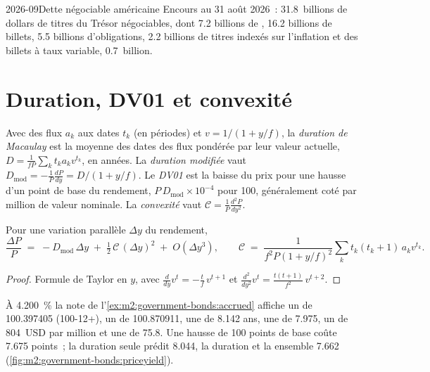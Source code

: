 \begin{dated}{2026-09}{Dette négociable américaine}\label{dat:m2:government-bonds:debt}
Encours au 31 août 2026~: 31.8~billions de dollars de titres du Trésor
négociables, dont 7.2 billions de , 16.2 billions de billets, 5.5
billions d'obligations, 2.2 billions de titres indexés sur l'inflation et des billets
à taux variable, 0.7~billion.
\end{dated}

\section{Duration, DV01 et convexité}

\begin{definition}\label{def:m2:government-bonds:duration}
Avec des flux $a_k$ aux dates $t_k$ (en périodes) et $v = 1/(1 + y/f)$, la
\emph{duration de Macaulay} est la moyenne des dates
des flux pondérée par leur valeur actuelle, $D = \frac{1}{f P}\sum_k t_k a_k v^{t_k}$,
en années. La \emph{duration modifiée} vaut
$D_{\mathrm{mod}} = -\frac1P \frac{dP}{dy} = D/(1 + y/f)$.
Le \emph{DV01} est la baisse du prix pour une hausse d'un point de base
du rendement, $P\,D_{\mathrm{mod}} \times 10^{-4}$ pour 100, généralement coté par million
de valeur nominale. La \emph{convexité} vaut $\mathcal C = \frac1P
\frac{d^2P}{dy^2}$.
\end{definition}

\begin{proposition}\label{prop:m2:government-bonds:taylor}
Pour une variation parallèle $\Delta y$ du rendement,
\[
\frac{\Delta P}{P} \;=\; -D_{\mathrm{mod}}\,\Delta y \;+\; \tfrac12\,\mathcal C\,(\Delta y)^2 \;+\; O(\Delta y^3),
\qquad
\mathcal C \;=\; \frac{1}{f^2 P (1+y/f)^2}\sum_k t_k(t_k+1)\,a_k v^{t_k} .
\]
\end{proposition}
\begin{proof}
Formule de Taylor en $y$, avec $\frac{d}{dy} v^{t} = -\frac{t}{f}\,v^{t+1}$ et
$\frac{d^2}{dy^2} v^t = \frac{t(t+1)}{f^2}\, v^{t+2}$.
\end{proof}

\begin{example}\label{ex:m2:government-bonds:risk}
À 4.200~\% la note de l'\cref{ex:m2:government-bonds:accrued} affiche un  de 100.397405 (100-12+), un  de 100.870911, une 
de 8.142 ans, une  de 7.975, un  de 804~USD par million et une
 de 75.8. Une hausse de 100 points de base coûte 7.675 points~; la duration seule
prédit 8.044, la duration et la  ensemble 7.662
(\cref{fig:m2:government-bonds:priceyield}).
\end{example}

